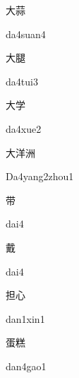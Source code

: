 \begin{multicols*}{2}
\begin{verbete}[da4suan4]{大蒜}
\begin{pronuncia}{da4suan4}
\end{pronuncia}
\end{verbete}

\begin{verbete}[da4tui3]{大腿}
\begin{pronuncia}{da4tui3}
\end{pronuncia}
\end{verbete}

\begin{verbete}[da4xue2]{大学}
\begin{pronuncia}{da4xue2}
\end{pronuncia}
\end{verbete}

\begin{verbete}{大洋洲}
\begin{pronuncia}{Da4yang2zhou1}
\end{pronuncia}
\end{verbete}

\begin{verbete}[dai4]{带}
\begin{pronuncia}{dai4}
\end{pronuncia}
\end{verbete}

\begin{verbete}[dai4]{戴}
\begin{pronuncia}{dai4}
\end{pronuncia}
\end{verbete}

\begin{verbete}{担心}
\begin{pronuncia}{dan1xin1}
\end{pronuncia}
\end{verbete}

\begin{verbete}{蛋糕}
\begin{pronuncia}{dan4gao1}
\end{pronuncia}
\end{verbete}


\end{multicols*}
